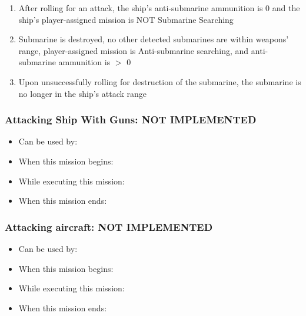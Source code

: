 \documentclass{article}
\begin{document}
\begin{itemize}
\begin{enumerate}[label=\arabic*)]
                    [Ship's mission becomes Transit to Base]
                    \item After rolling for an attack, the ship's anti-submarine ammunition is 0 and the ship's player-assigned mission is NOT Submarine Searching \par
                    [Ship resumes player-assigned mission]
                    \item Submarine is destroyed, no other detected submarines are within weapons' range, player-assigned mission is Anti-submarine searching, and anti-submarine ammunition is $>$ 0\par
                    [Ship's mission becomes Antisubmarine searching]
                    \item Upon unsuccessfully rolling for destruction of the submarine, the submarine is no longer in the ship's attack range\par
                    [Ship resumes player-assigned mission]
                \end{enumerate}
            \end{itemize}

    \subsubsection{Attacking Ship With Guns: NOT IMPLEMENTED}
            \begin{itemize}
                \item{Can be used by:} 
                \item{When this mission begins:} 
                \item{While executing this mission:} 
                \item{When this mission ends:} 
            \end{itemize}
            
    \subsubsection{Attacking aircraft: NOT IMPLEMENTED}
            \begin{itemize}
                \item{Can be used by:} 
                \item{When this mission begins:} 
                \item{While executing this mission:} 
                \item{When this mission ends:} 
            \end{itemize}
\end{document}
